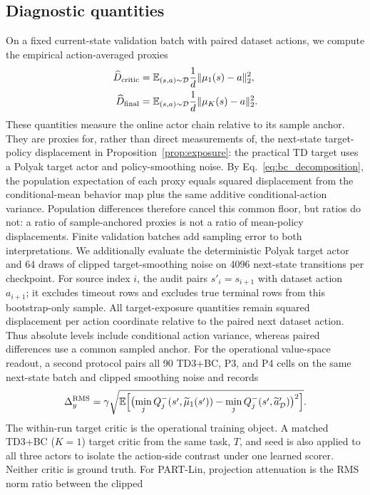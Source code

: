 \documentclass[twoside]{article}
\begin{document}
\subsection{Diagnostic quantities}
On a fixed current-state validation batch with paired dataset actions, we
compute the empirical action-averaged proxies
\[
\begin{aligned}
\widehat D_{\rm critic}
&=\mathbb E_{(s,a)\sim\mathcal D}\frac{1}{d}\|\mu_1(s)-a\|_2^2,\\
\widehat D_{\rm final}
&=\mathbb E_{(s,a)\sim\mathcal D}\frac{1}{d}\|\mu_K(s)-a\|_2^2.
\end{aligned}
\]
These quantities measure the online actor chain relative to its sample anchor.
They are proxies for, rather than direct measurements of, the next-state
target-policy displacement in Proposition~\ref{prop:exposure}: the practical
TD target uses a Polyak target actor and policy-smoothing noise.
By Eq.~\eqref{eq:bc_decomposition}, the population expectation of each proxy
equals squared displacement from the conditional-mean behavior map plus the
same additive conditional-action variance. Population differences therefore
cancel this common floor, but ratios do not: a ratio of sample-anchored proxies
is not a ratio of mean-policy displacements. Finite validation batches add
sampling error to both interpretations.
We additionally evaluate the deterministic Polyak target actor and 64 draws
of clipped target-smoothing noise on 4096 next-state transitions per
checkpoint. For source index $i$, the audit pairs $s'_i=s_{i+1}$ with dataset
action $a_{i+1}$; it excludes timeout rows and excludes true terminal rows from
this bootstrap-only sample. All target-exposure quantities remain squared
displacement per action coordinate relative to the paired next dataset action. Thus absolute
levels include conditional action variance, whereas paired differences use a
common sampled anchor.
For the operational value-space readout, a second protocol pairs all 90
TD3+BC, P3, and P4 cells on the same next-state batch and clipped smoothing
noise and records
\[
\Delta_y^{\rm RMS}=\gamma\sqrt{\mathbb E
  \Bigl[\bigl(\min_j Q_j^-(s',\widetilde\mu_1(s'))
  -\min_j Q_j^-(s',\widetilde a_{\mathcal D}')\bigr)^2\Bigr]}.
\]
The within-run target critic is the operational training object. A matched
TD3+BC ($K=1$) target critic from the same task, $T$, and seed is also applied
to all three actors to isolate the action-side contrast under one learned
scorer. Neither critic is ground truth.
For PART-Lin, projection attenuation is the RMS norm ratio between the clipped
\end{document}
